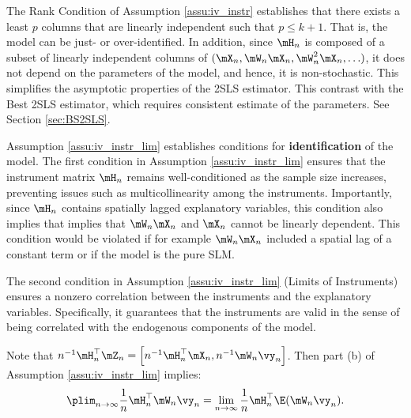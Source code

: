 \documentclass[english,12pt]{book}\usepackage[]{graphicx}\usepackage[]{xcolor}
\begin{document}
The Rank Condition of Assumption \ref{assu:iv_instr} establishes that there exists a least $p$ columns that are linearly independent such that $p \leq k + 1$. That is, the model can be just- or over-identified. In addition, since $\mH_n$ is composed of a subset of linearly independent columns of $(\mX_n, \mW_n\mX_n, \mW^2_n\mX_n, \ldots)$, it does not depend on the parameters of the model, and hence, it is non-stochastic. This simplifies the asymptotic properties of the 2SLS estimator. This contrast with the Best 2SLS estimator, which requires consistent estimate of the parameters. See Section \ref{sec:BS2SLS}.   

Assumption \ref{assu:iv_instr_lim} establishes conditions for \textbf{identification} of the model. The first condition in Assumption \ref{assu:iv_instr_lim} ensures that the instrument matrix $\mH_n$ remains well-conditioned as the sample size increases, preventing issues such as multicollinearity among the instruments. Importantly, since $\mH_n$ contains spatially lagged explanatory variables, this condition also implies that implies that $\mW_n\mX_n$ and $\mX_n$ cannot be linearly dependent. This condition would be violated if for example $\mW_n\mX_n$ included a spatial lag of a constant term or if the model is the pure SLM.  

The second condition in Assumption \ref{assu:iv_instr_lim} (Limits of Instruments) ensures a nonzero correlation between the instruments and the explanatory variables. Specifically, it guarantees that the instruments are valid in the sense of being correlated with the endogenous components of the model.  

Note that $n^{-1}\mH_n^\top\mZ_n = \left[n^{-1}\mH_n^\top\mX_n, n^{-1}\mW_n\vy_n\right]$. Then part (b) of Assumption \ref{assu:iv_instr_lim} implies:
\begin{equation}\label{eq:implication-of-plimHQ}
\plim_{n\to\infty} \frac{1}{n}\mH_n^\top\mW_n\vy_n = \lim_{n\to \infty}\frac{1}{n}\mH_n^\top\E(\mW_n\vy_n). 
\end{equation}
\end{document}
